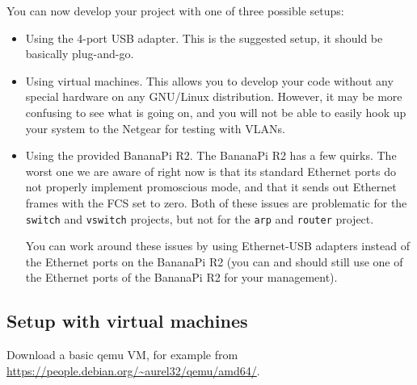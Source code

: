 \documentclass{article}
\begin{document}
You can now develop your project with one of three possible setups:
\begin{itemize}
\item Using the 4-port USB adapter. This is the suggested setup, it
  should be basically plug-and-go.
\item Using virtual machines. This allows you to develop your code
  without any special hardware on any GNU/Linux distribution. However,
  it may be more confusing to see what is going on, and you will not
  be able to easily hook up your system to the Netgear for testing
  with VLANs.
\item Using the provided BananaPi R2. The BananaPi R2 has a few
  quirks. The worst one we are aware of right now is that its
  standard Ethernet ports do not properly implement promoscious mode,
  and that it sends out Ethernet frames with the FCS set to zero.
  Both of these issues are problematic for the {\tt switch} and
  {\tt vswitch} projects, but not for the {\tt arp} and {\tt router}
  project.
  
  You can work around these issues by using Ethernet-USB adapters
  instead of the Ethernet ports on the BananaPi R2 (you can and
  should still use one of the Ethernet ports of the BananaPi R2 for
  your management).
\end{itemize}

\subsection{Setup with virtual machines}

Download a basic qemu VM, for example from
\url{https://people.debian.org/~aurel32/qemu/amd64/}.
\end{document}
